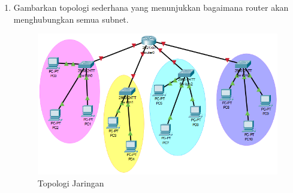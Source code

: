 \begin{enumerate}
    \item Gambarkan topologi sederhana yang menunjukkan bagaimana router akan menghubungkan semua subnet.
    \begin{figure}[htbp] 
        \centering  
        \includegraphics[width=1\textwidth]{Template Laporan Sementara/P1/img/cisco.png}  
        \caption{Topologi Jaringan} 
        \label{fig:nama_gambar} 
    \end{figure}
    

\end{enumerate}
